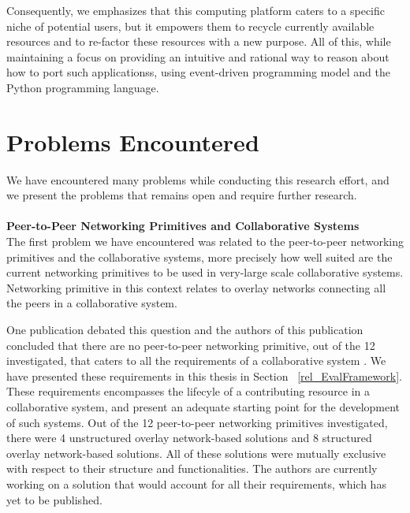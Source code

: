 \documentclass[12pt, titlepage]{uo_temp}
\begin{document}
     Consequently, we emphasizes that this computing platform caters to a specific niche
     of potential users, but it empowers them to recycle currently available resources and
     to re-factor these resources with a new purpose. All of this, while maintaining a
     focus on providing an intuitive and rational way to reason about how to port such
     applicationss, using event-driven programming model and the Python programming language.

     \section{Problems Encountered}\label{probs}
     We have encountered many problems while conducting this research effort, and
     we present the problems that remains open and require further research. \\

     \\ \textbf{Peer-to-Peer Networking Primitives and Collaborative Systems}\\
     The first problem we have encountered was related to the peer-to-peer networking
     primitives and the collaborative systems, more precisely how well suited are the
     current networking primitives to be used in very-large scale collaborative
     systems. Networking primitive in this context relates to overlay networks connecting
     all the peers in a collaborative system.

     One publication debated this question and the authors of this publication concluded
     that there are no peer-to-peer networking primitive, out of the 12 investigated, that
     caters to all the requirements of a collaborative system \cite{p2p_collab}. We have
     presented these requirements in this thesis in Section ~\ref{rel_EvalFramework}.
     These requirements encompasses the lifecyle of a contributing resource in a
     collaborative system, and present an adequate starting point for the development of
     such systems. Out of the 12 peer-to-peer networking primitives investigated, there
     were 4 unstructured overlay network-based solutions and 8 structured overlay
     network-based solutions. All of these solutions were mutually exclusive with respect
     to their structure and functionalities. The authors are currently working on a
     solution that would account for all their requirements, which has yet to be
     published.
\end{document}
